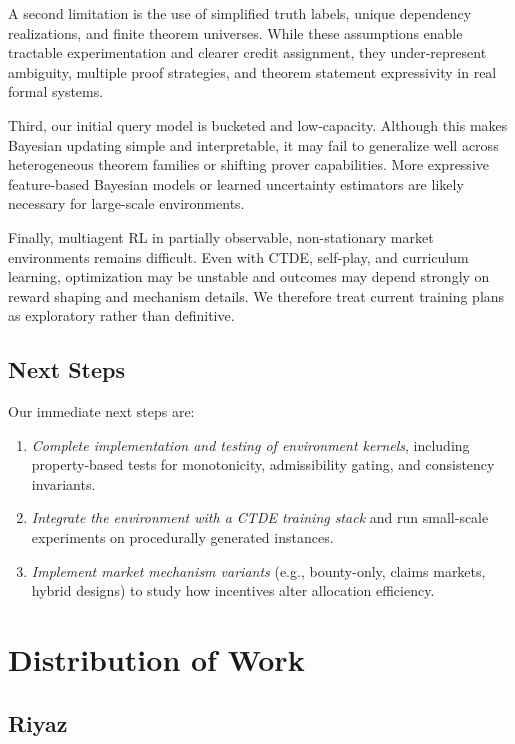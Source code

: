 \documentclass[letterpaper]{article} %
\begin{document}
A second limitation is the use of simplified truth labels, unique dependency realizations, and finite theorem universes. While these assumptions enable tractable experimentation and clearer credit assignment, they under-represent ambiguity, multiple proof strategies, and theorem statement expressivity in real formal systems.

Third, our initial query model is bucketed and low-capacity. Although this makes Bayesian updating simple and interpretable, it may fail to generalize well across heterogeneous theorem families or shifting prover capabilities. More expressive feature-based Bayesian models or learned uncertainty estimators are likely necessary for large-scale environments.

Finally, multiagent RL in partially observable, non-stationary market environments remains difficult. Even with CTDE, self-play, and curriculum learning, optimization may be unstable and outcomes may depend strongly on reward shaping and mechanism details. We therefore treat current training plans as exploratory rather than definitive.

\subsection{Next Steps}

Our immediate next steps are:

\begin{enumerate}
    \item \textit{Complete implementation and testing of environment kernels}, including property-based tests for monotonicity, admissibility gating, and consistency invariants.
    \item \textit{Integrate the environment with a CTDE training stack} and run small-scale experiments on procedurally generated instances.
    \item \textit{Implement market mechanism variants} (e.g., bounty-only, claims markets, hybrid designs) to study how incentives alter allocation efficiency.
\end{enumerate}

\section{Distribution of Work}
\subsection{Riyaz}
\end{document}
